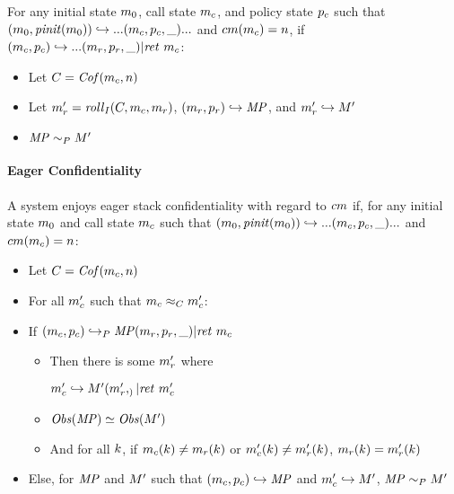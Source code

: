 \documentclass[conference]{IEEEtran}
\begin{document}
      For any initial state \(m_0\), call state \(m_c\), and policy state \(p_c\) such that
      \((m_0,\mathit{pinit}(m_0)) \hookrightarrow ... (m_c,p_c,\_) ...\)
      and \(cm(m_c) = n\), if \((m_c,p_c) \hookrightarrow ...
        (m_r,p_r,\_) | \mathit{ret}\ m_c\):

          \begin{itemize}
            \item Let \(C = \mathit{Cof}(m_c,n)\)
            \item Let \(m_r' = \mathit{roll}_I(C,m_c,m_r)\), \((m_r,p_r)
              \hookrightarrow \mathit{MP}\), and \(m_r' \hookrightarrow M'\)
            \item \(\mathit{MP} \sim_P M'\)
          \end{itemize}
    
    \paragraph{Eager Confidentiality}

      A system enjoys eager stack confidentiality with regard to \(cm\) if, for any initial state
      \(m_0\) and call state \(m_c\) such that
      \((m_0,\mathit{pinit}(m_0)) \hookrightarrow ... (m_c,p_c,\_) ...\) and
      \(cm(m_c) = n\):

      \begin{itemize}
        \item Let \(C = \mathit{Cof}(m_c,n)\)
        \item For all \(m_c'\) such that \(m_c \approx_C m_c'\):
        \item If \((m_c,p_c) \hookrightarrow_P \mathit{MP} (m_r,p_r,\_) | \mathit{ret}\ m_c\)
          \begin{itemize}
            \item Then there is some \(m_r'\) where
              
              \(m_c' \hookrightarrow M' (m_r',_) | \mathit{ret}\ m_c'\)
            \item \(\mathit{Obs}(\mathit{MP}) \simeq \mathit{Obs}(M')\)
            \item And for all \(k\), if \(m_c(k) \not = m_r(k)\) or
              \(m_c'(k) \not = m_r'(k)\), \(m_r(k) = m_r'(k)\)
          \end{itemize}
        \item Else, for \(\mathit{MP}\) and \(M'\) such that \((m_c,p_c) \hookrightarrow \mathit{MP}\)
          and \(m_c' \hookrightarrow M'\), \(\mathit{MP} \sim_P M'\)
      \end{itemize}
\end{document}
